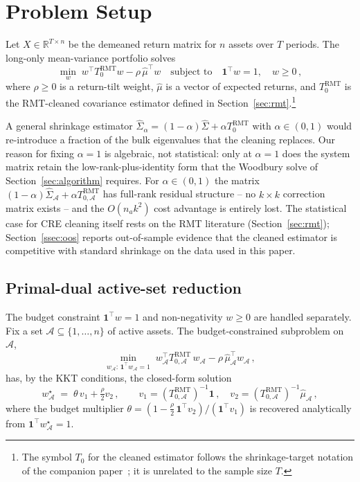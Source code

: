 \section{Problem Setup}\label{sec:problem}

Let $X \in \mathbb{R}^{T \times n}$ be the demeaned return matrix for $n$ assets
over $T$ periods. The long-only mean-variance portfolio solves
\[
  \min_{w}\; w^\top T_0^{\mathrm{RMT}} w - \rho\,\hat\mu^\top w
  \quad\text{subject to}\quad
  \mathbf{1}^\top w = 1,\quad w \geq 0\,,
\]
where $\rho \geq 0$ is a return-tilt weight, $\hat\mu$ is a vector of expected
returns, and $T_0^{\mathrm{RMT}}$ is the RMT-cleaned covariance estimator defined
in Section~\ref{sec:rmt}.\footnote{The symbol $T_0$ for the cleaned estimator
follows the shrinkage-target notation of the companion
paper~\cite{fast_minimum_variance}; it is unrelated to the sample size $T$.}

\begin{remark}\label{rem:blend}
A general shrinkage estimator
$\hat\Sigma_\alpha = (1-\alpha)\hat\Sigma + \alpha T_0^{\mathrm{RMT}}$ with
$\alpha \in (0,1)$ would re-introduce a fraction of the bulk eigenvalues that
the cleaning replaces. Our reason for fixing $\alpha = 1$ is algebraic, not
statistical: only at $\alpha = 1$ does the system matrix retain the
low-rank-plus-identity form that the Woodbury solve of
Section~\ref{sec:algorithm} requires. For $\alpha \in (0,1)$ the matrix
$(1-\alpha)\hat\Sigma_\mathcal{A} + \alpha T_{0,\mathcal{A}}^{\mathrm{RMT}}$
has full-rank residual structure -- no $k \times k$ correction matrix exists --
and the $O(n_a k^2)$ cost advantage is entirely lost. The statistical case for
CRE cleaning itself rests on the RMT literature
(Section~\ref{sec:rmt}); Section~\ref{ssec:oos} reports out-of-sample
evidence that the cleaned estimator is competitive with standard shrinkage on
the data used in this paper.
\end{remark}

\subsection{Primal-dual active-set reduction}

The budget constraint $\mathbf{1}^\top w = 1$ and non-negativity $w \geq 0$
are handled separately. Fix a set $\mathcal{A} \subseteq \{1,\ldots,n\}$ of
active assets. The budget-constrained subproblem on $\mathcal{A}$,
\[
  \min_{w_\mathcal{A}:\,\mathbf{1}^\top w_\mathcal{A}=1}\;
  w_\mathcal{A}^\top T_{0,\mathcal{A}}^{\mathrm{RMT}}\, w_\mathcal{A}
  - \rho\,\hat\mu_\mathcal{A}^\top w_\mathcal{A}\,,
\]
has, by the KKT conditions, the closed-form solution
\[
  w^\star_\mathcal{A}
  \;=\; \theta\, v_1 + \tfrac{\rho}{2} v_2\,,
  \qquad
  v_1 = (T_{0,\mathcal{A}}^{\mathrm{RMT}})^{-1}\mathbf{1}\,,
  \quad
  v_2 = (T_{0,\mathcal{A}}^{\mathrm{RMT}})^{-1}\hat\mu_\mathcal{A}\,,
\]
where the budget multiplier
$\theta = (1 - \tfrac{\rho}{2}\,\mathbf{1}^\top v_2) / (\mathbf{1}^\top v_1)$
is recovered analytically from $\mathbf{1}^\top w^\star_\mathcal{A} = 1$.

